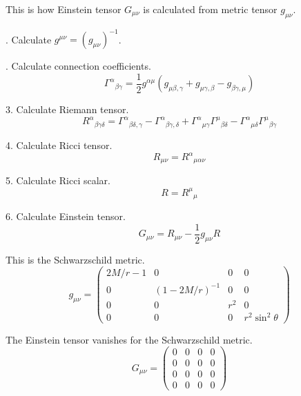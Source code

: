 \documentclass[12pt]{article}
\begin{document}
This is how Einstein tensor $G_{\mu\nu}$ is calculated from metric tensor $g_{\mu\nu}$.

. Calculate $g^{\mu\nu}=(g_{\mu\nu})^{-1}$.

. Calculate connection coefficients.
\begin{equation*}
\Gamma^\alpha{}_{\beta\gamma}=\frac{1}{2}
g^{\alpha\mu}(g_{\mu\beta,\gamma}+g_{\mu\gamma,\beta}-g_{\beta\gamma,\mu})
\end{equation*}

3. Calculate Riemann tensor.
\begin{equation*}
R^\alpha{}_{\beta\gamma\delta}
=\Gamma^\alpha{}_{\beta\delta,\gamma}
-\Gamma^\alpha{}_{\beta\gamma,\delta}
+\Gamma^\alpha{}_{\mu\gamma}\Gamma^\mu{}_{\beta\delta}
-\Gamma^\alpha{}_{\mu\delta}\Gamma^\mu{}_{\beta\gamma}
\end{equation*}

4. Calculate Ricci tensor.
\begin{equation*}
R_{\mu\nu}=R^\alpha{}_{\mu\alpha\nu}
\end{equation*}

5. Calculate Ricci scalar.
\begin{equation*}
R=R^\mu{}_\mu
\end{equation*}

6. Calculate Einstein tensor.
\begin{equation*}
G_{\mu\nu}=R_{\mu\nu}-\frac{1}{2}g_{\mu\nu}R
\end{equation*}

This is the Schwarzschild metric.
\begin{equation*}
g_{\mu\nu}=\begin{pmatrix}
2M/r-1 & 0 & 0 & 0
\\
0 & (1 - 2M/r)^{-1} & 0 & 0
\\
0 & 0 & r^2 & 0
\\
0 & 0 & 0 & r^2\sin^2\theta
\end{pmatrix}
\end{equation*}

The Einstein tensor vanishes for the Schwarzschild metric.
\begin{equation*}
G_{\mu\nu}=\begin{pmatrix}
0 & 0 & 0 & 0
\\
0 & 0 & 0 & 0
\\
0 & 0 & 0 & 0
\\
0 & 0 & 0 & 0
\end{pmatrix}
\end{equation*}
\end{document}
